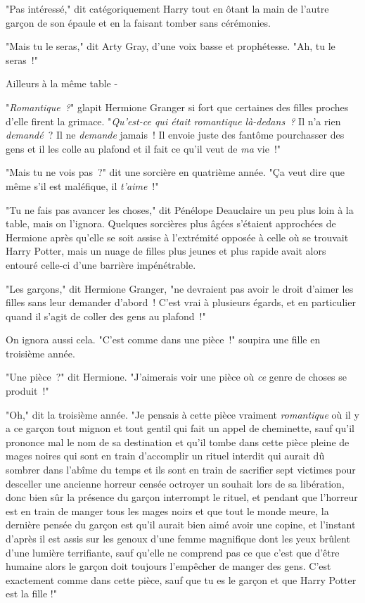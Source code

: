 "Pas intéressé," dit catégoriquement Harry tout en ôtant la main de l'autre garçon de son épaule et en la faisant tomber sans cérémonies.

"Mais tu le seras," dit Arty Gray, d'une voix basse et prophétesse. "Ah, tu le seras~!"

Ailleurs à la même table -

"\emph{Romantique~?}" glapit Hermione Granger si fort que certaines des filles proches d'elle firent la grimace. "\emph{Qu'est-ce qui était romantique là-dedans~?} Il n'a rien \emph{demandé}~? Il ne \emph{demande} jamais~! Il envoie juste des fantôme pourchasser des gens et il les colle au plafond et il fait ce qu'il veut de \emph{ma} vie~!"

"Mais tu ne vois pas~?" dit une sorcière en quatrième année. "Ça veut dire que même s'il est maléfique, il \emph{t'aime}~!"

"Tu ne fais pas avancer les choses," dit Pénélope Deauclaire un peu plus loin à la table, mais on l'ignora. Quelques sorcières plus âgées s'étaient approchées de Hermione après qu'elle se soit assise à l'extrémité opposée à celle où se trouvait Harry Potter, mais un nuage de filles plus jeunes et plus rapide avait alors entouré celle-ci d'une barrière impénétrable.

"Les garçons," dit Hermione Granger, "ne devraient pas avoir le droit d'aimer les filles sans leur demander d'abord~! C'est vrai à plusieurs égards, et en particulier quand il s'agit de coller des gens au plafond~!"

On ignora aussi cela. "C'est comme dans une pièce~!" soupira une fille en troisième année.

"Une pièce~?" dit Hermione. "J'aimerais voir une pièce où \emph{ce} genre de choses se produit~!"

"Oh," dit la troisième année. "Je pensais à cette pièce vraiment \emph{romantique} où il y a ce garçon tout mignon et tout gentil qui fait un appel de cheminette, sauf qu'il prononce mal le nom de sa destination et qu'il tombe dans cette pièce pleine de mages noires qui sont en train d'accomplir un rituel interdit qui aurait dû sombrer dans l'abîme du temps et ils sont en train de sacrifier sept victimes pour desceller une ancienne horreur censée octroyer un souhait lors de sa libération, donc bien sûr la présence du garçon interrompt le rituel, et pendant que l'horreur est en train de manger tous les mages noirs et que tout le monde meure, la dernière pensée du garçon est qu'il aurait bien aimé avoir une copine, et l'instant d'après il est assis sur les genoux d'une femme magnifique dont les yeux brûlent d'une lumière terrifiante, sauf qu'elle ne comprend pas ce que c'est que d'être humaine alors le garçon doit toujours l'empêcher de manger des gens. C'est exactement comme dans cette pièce, sauf que tu es le garçon et que Harry Potter est la fille !"

